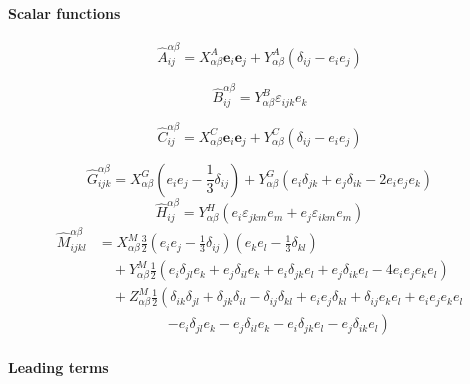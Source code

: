 \documentclass[12pt]{article}
\begin{document}
\paragraph{Scalar functions}

\begin{equation}
  \hat{A}_{ij}^{\alpha \beta}
  = 
  X_{\alpha \beta}^{A} \bm{e}_i \bm{e}_j
  +
  Y_{\alpha \beta}^{A} (\delta_{ij} - e_i e_j)
\end{equation}

\begin{equation}
  \hat{B}_{ij}^{\alpha \beta}
  = 
  Y_{\alpha \beta}^{B}   \varepsilon_{ijk} e_k
\end{equation}

\begin{equation}
  \hat{C}_{ij}^{\alpha \beta}
  = 
  X_{\alpha \beta}^{C} \bm{e}_i \bm{e}_j
  +
  Y_{\alpha \beta}^{C} (\delta_{ij} - e_i e_j)
\end{equation}

\begin{equation}
 \hat{G}_{ijk}^{\alpha \beta}
 = 
X_{\alpha\beta}^{G} 
\left(e_ie_j - \frac{1}{3}\delta_{ij}\right)
+
Y_{\alpha\beta}^{G}
\left(
e_i \delta_{jk} + e_j \delta_{ik} - 2 e_i e_j e_k
\right)
\end{equation}
\begin{equation}
 \hat{H}_{ij}^{\alpha\beta}
 = Y_{\alpha\beta}^{H}
(e_i \varepsilon_{jkm} e_m 
+ e_j \varepsilon_{ikm} e_m )
\end{equation}
\begin{align}
 \hat{M}_{ijkl}^{\alpha\beta}
& = X_{\alpha\beta}^{M}
\frac{3}{2}
 \left(e_i e_j
 - \frac{1}{3} \delta_{ij}
\right)
 \left(e_k e_l
 - \frac{1}{3} \delta_{kl}
\right) \\
& \quad
+ 
Y_{\alpha\beta}^{M}
\frac{1}{2}
\left(
e_i \delta_{jl} e_k
+
e_j \delta_{il} e_k
+
e_i \delta_{jk} e_l
+
e_j \delta_{ik} e_l
-
4 e_i e_j e_k e_l
\right) \\
&\quad
+ Z_{\alpha\beta}^{M}
\frac{1}{2}
\left(
\delta_{ik}\delta_{jl}
+
\delta_{jk}\delta_{il}
-
\delta_{ij}\delta_{kl}
+
e_i e_j \delta_{kl} 
+
\delta_{ij} e_k e_l
+
e_i e_j e_k e_l \right.\\
&\qquad \qquad \quad
\left.
- 
e_i \delta_{jl} e_k
-
e_j \delta_{il} e_k
-
e_i \delta_{jk} e_l
-
e_j \delta_{ik} e_l
\right)
\end{align}

\paragraph{Leading terms}
\end{document}
